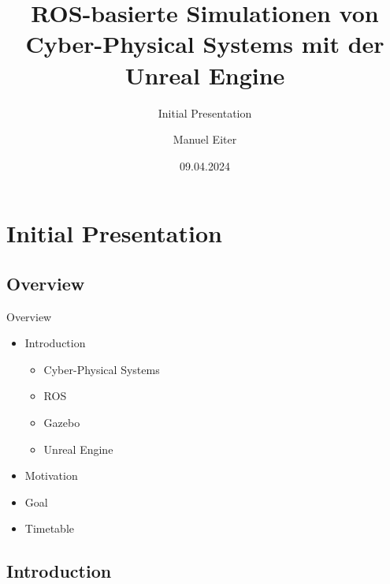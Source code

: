 \documentclass[11pt,t,usepdftitle=false,aspectratio=169]{beamer}
\title[Inital Presentation]{ROS-basierte Simulationen von Cyber-Physical Systems mit der Unreal Engine}
\subtitle{Initial Presentation}
\author{Manuel Eiter}
\date{09.04.2024}
\begin{document}
\section{Initial Presentation}

\subsection{Overview}

\begin{frame}{Overview}
   \begin{itemize}
      \item Introduction
      \begin{itemize}
         \item Cyber-Physical Systems
         \item ROS
         \item Gazebo
         \item Unreal Engine
      \end{itemize}
      \item Motivation
      \item Goal
      \item Timetable
   \end{itemize}
\end{frame}

\subsection{Introduction}
\end{document}
